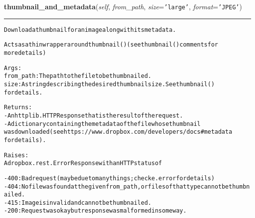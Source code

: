 \hspace{.8\funcindent}\begin{boxedminipage}{\funcwidth}

    \raggedright \textbf{thumbnail\_and\_metadata}(\textit{self}, \textit{from\_path}, \textit{size}={\tt \texttt{'}\texttt{large}\texttt{'}}, \textit{format}={\tt \texttt{'}\texttt{JPEG}\texttt{'}})

    \vspace{-1.5ex}

    \rule{\textwidth}{0.5\fboxrule}
\setlength{\parskip}{2ex}
\begin{alltt}
Download a thumbnail for an image alongwith its metadata.

Acts as a thin wrapper around thumbnail() (see thumbnail() comments for
more details)

Args:
    from\_path: The path to the file to be thumbnailed.
    size: A string describing the desired thumbnail size. See thumbnail()
       for details.

Returns:
    - An httplib.HTTPResponse that is the result of the request.
    - A dictionary containing the metadata of the file whose thumbnail
      was downloaded (see https://www.dropbox.com/developers/docs\#metadata
      for details).

Raises:
    A dropbox.rest.ErrorResponse with an HTTP status of

    - 400: Bad request (may be due to many things; check e.error for details)
    - 404: No file was found at the given from\_path, or files of that type cannot be thumbnailed.
    - 415: Image is invalid and cannot be thumbnailed.
    - 200: Request was okay but response was malformed in some way.
\end{alltt}

\setlength{\parskip}{1ex}
    \end{boxedminipage}

    \label{lib:dropbox:DropboxClient:search}

    \vspace{0.5ex}

